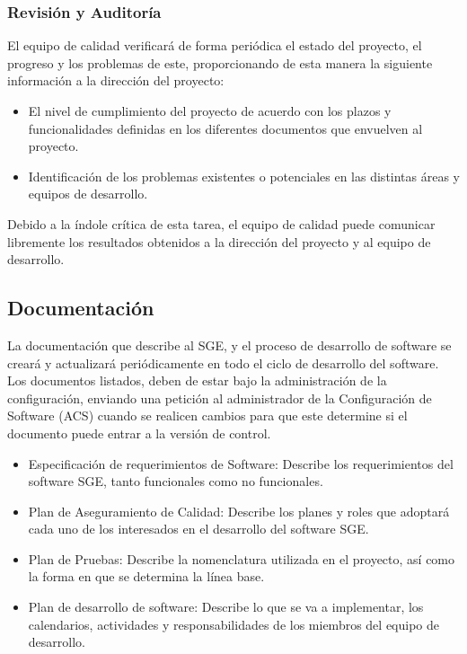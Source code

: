 \documentclass[a4paper,10pt]{article}
\begin{document}
	\subsubsection{Revisión y Auditoría}
	El equipo de calidad verificará de forma periódica el estado del proyecto, el progreso y los problemas de este, proporcionando de esta manera la siguiente información a la dirección del proyecto:
	\begin{itemize}
		\item El nivel de cumplimiento del proyecto de acuerdo con los plazos y funcionalidades definidas en los diferentes documentos que envuelven al proyecto.
		\item Identificación de los problemas existentes o potenciales en las distintas áreas y equipos de desarrollo.
	\end{itemize}
	
	Debido a la índole crítica de esta tarea, el equipo de calidad puede comunicar libremente los resultados obtenidos a la dirección del proyecto y al equipo de desarrollo.
	
	\subsection{Documentación}
	La documentación que describe al SGE, y el proceso de desarrollo de software se creará y actualizará periódicamente en todo el ciclo de desarrollo del software. Los documentos listados, deben de estar bajo la administración de la configuración, enviando una petición al administrador de la Configuración de Software (ACS) cuando se realicen cambios para que este determine si el documento puede entrar a la versión de control.
	
	\begin{itemize}
		\item Especificación de requerimientos de Software: Describe los requerimientos del software SGE, tanto funcionales como no funcionales.
		\item Plan de Aseguramiento de Calidad: Describe los planes y roles que adoptará cada uno de los interesados en el desarrollo del software SGE.
		\item Plan de Pruebas: Describe la nomenclatura utilizada en el proyecto, así como la forma en que se determina la línea base.
		\item Plan de desarrollo de software: Describe lo que se va a implementar, los calendarios, actividades y responsabilidades de los miembros del equipo de desarrollo.
	\end{itemize}
	
\end{document}
